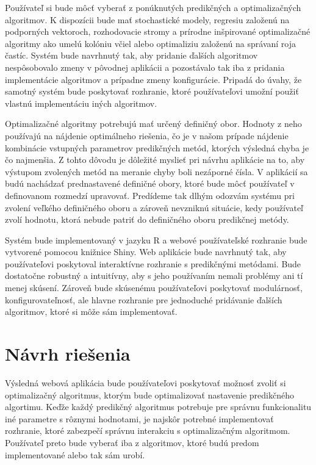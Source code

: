 \documentclass[a4paper,slovak,12pt,appendix]{article}
\begin{document}
Používateľ si bude môcť vyberať z ponúknutých predikčných a optimalizačných
algoritmov. K dispozícii bude mať stochastické modely,
regresiu založenú na podporných vektoroch, rozhodovacie stromy a prírodne
inšpirované optimalizačné algoritmy ako umelú kolóniu včiel alebo optimaliziu
založenú na správaní roja častíc. Systém bude navrhnutý tak, aby pridanie
ďalších algoritmov nespôsobovalo zmeny v pôvodnej aplikácii a pozostávalo tak
iba z pridania implementácie algoritmov a prípadne zmeny konfigurácie.
Pripadá do úvahy, že samotný systém bude poskytovať rozhranie, ktoré
používateľovi umožní použiť vlastnú implementáciu iných algoritmov.

Optimalizačné algoritmy potrebujú mať určený definičný obor. Hodnoty
z neho používajú na nájdenie optimálneho riešenia, čo je v našom prípade
nájdenie kombinácie vstupných parametrov predikčných metód, ktorých výsledná
chyba je čo najmenšia. Z tohto dôvodu je dôležité myslieť pri návrhu aplikácie
na to, aby výstupom zvolených metód na meranie chyby boli nezáporné čísla.
V aplikácií sa budú nachádzať prednastavené definičné obory, ktoré bude môcť
používateľ v definovanom rozmedzí upravovať. Predídeme tak dlhým odozvám
systému pri zvolení veľkého definičného oboru a zároveň nevzniknú situácie,
kedy používateľ zvolí hodnotu, ktorá nebude patriť do definičného oboru
predikčnej metódy.

Systém bude implementovaný v jazyku R a webové používateľské rozhranie bude
vytvorené pomocou knižnice Shiny. Web aplikácie bude navrhnutý tak, aby
používateľovi poskytoval interaktívne rozhranie s predikčnými metódami.
Bude dostatočne robustný a intuitívny, aby s jeho používaním nemali problémy
ani tí menej skúsení. Zároveň bude skúsenému používateľovi poskytovať
modulárnosť, konfigurovateľnosť, ale hlavne rozhranie pre jednoduché pridávanie
ďalších algoritmov, ktoré si môže sám implementovať.


\newpage
\section{Návrh riešenia}
\label{solution-design}
Výsledná webová aplikácia bude používateľovi poskytovať možnosť zvoliť si
optimalizačný algoritmus, ktorým bude optimalizovať nastavenie predikčného
algortimu. Keďže každý predikčný algoritmus potrebuje pre správnu funkcionalitu
iné parametre s rôznymi hodnotami, je najskôr potrebné implementovať rozhranie,
ktoré zabezpečí správnu interakciu s optimalizačným algoritmom. Používateľ
preto bude vyberať iba z algoritmov, ktoré budú predom implementované alebo tak
sám urobí.
\end{document}
